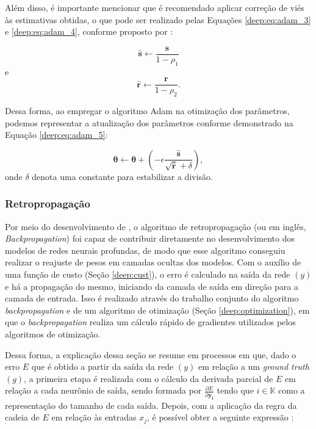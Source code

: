 Além disso, é importante mencionar que é recomendado aplicar correção de viés às estimativas obtidas, o que pode ser realizado pelas Equações \ref{deep:eq:adam_3} e \ref{deep:eq:adam_4}, conforme proposto por \cite{Goodfellow2016}:

\begin{equation}
    \label{deep:eq:adam_3}
    \boldsymbol{\hat{s}} \leftarrow \frac{\boldsymbol{s}}{1-\rho_1}
\end{equation}
e
\begin{equation}
    \label{deep:eq:adam_4}
    \boldsymbol{\hat{r}} \leftarrow \frac{\boldsymbol{r}}{1-\rho_2}.
\end{equation}

Dessa forma, ao empregar o algoritmo Adam na otimização dos parâmetros, podemos representar a atualização dos parâmetros conforme demonstrado na Equação \ref{deep:eq:adam_5}:

\begin{equation}
    \label{deep:eq:adam_5}
    \boldsymbol{\theta} \leftarrow \boldsymbol{\theta} + \left(-\epsilon \frac{\boldsymbol{\hat{s}}}{\sqrt{\boldsymbol{\hat{r}}}+\delta}\right),
\end{equation}
onde $\delta$ denota uma constante para estabilizar a divisão.


\subsubsection{Retropropagação}
\label{deep:backprop}

\begin{sloppypar}
Por meio do desenvolvimento de \cite{rumelhart1986learning}, o algoritmo de retropropagação (ou em inglês, \textit{Backpropagation}) foi capaz de contribuir diretamente no desenvolvimento dos modelos de redes neurais profundas, de modo que esse algoritmo conseguiu realizar o reajuste de pesos em camadas ocultas dos modelos. Com o auxílio de uma função de custo (Seção
\ref{deep:cust}), o erro é calculado na saída da rede $(y)$ e há a propagação do mesmo, iniciando da camada de saída em direção para a camada de entrada. Isso é realizado através do trabalho conjunto do algoritmo \textit{backpropagation} e de um algoritmo de otimização (Seção \ref{deep:optimization}), em que o \textit{backpropagation} realiza um cálculo rápido de gradientes utilizados pelos algoritmos de otimização.
\end{sloppypar}

Dessa forma, a explicação dessa seção se resume em processos em que, dado o erro $E$ que é obtido a partir da saída da rede $(y)$ em relação a um \textit{ground truth} $(g)$, a primeira etapa é realizada com o cálculo da derivada parcial de $E$ em relação a cada neurônio de saída, sendo formada por $\frac{\partial E}{\partial \boldsymbol{y_i}}$ tendo que $i \in \mathbb{K}$ como a representação do tamanho de cada saída. Depois, com a aplicação da regra da cadeia de $E$ em relação às entradas $x_j$, é possível obter a seguinte expressão \citep{rumelhart1986learning}:

